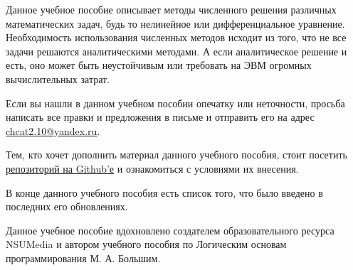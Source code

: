 \documentclass[17pt, a4paper]{extarticle}
\begin{document}

	Данное учебное пособие описывает методы численного решения различных
	математических задач, будь то нелинейное или дифференциальное уравнение.
	Необходимость использования численных методов исходит из того, что не
	все задачи решаются аналитическими методами. А если аналитическое
	решение и есть, оно может быть неустойчивым или требовать на ЭВМ
	огромных вычислительных затрат.

	Если вы нашли в данном учебном пособии опечатку или неточности, просьба
	написать все правки и предложения в письме и отправить его на адрес
	\href{mailto:chcat2.10@yandex.ru}{chcat2.10@yandex.ru}.

	Тем, кто хочет дополнить материал данного учебного пособия, стоит
	посетить \href{https://github.com/mu2so4/Computational-Mathematics-Book}
	{\underline{репозиторий на Github'е}} и ознакомиться с условиями их
	внесения.

	В конце данного учебного пособия есть список того, что было введено в
	последних его обновлениях.
	\newline\newline

	Данное учебное пособие вдохновлено создателем образовательного ресурса
	NSUMedia и автором учебного пособия по Логическим основам
	программирования М. А. Большим.
\end{document}
